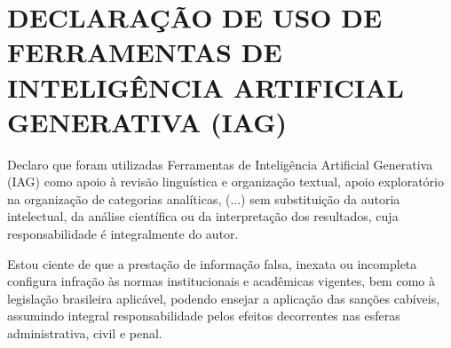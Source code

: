 \chapter*{DECLARAÇÃO DE USO DE FERRAMENTAS DE INTELIGÊNCIA ARTIFICIAL GENERATIVA (IAG)}
\label{declaracao_iag}

Declaro que foram utilizadas Ferramentas de Inteligência Artificial Generativa (IAG) como apoio à revisão linguística e organização textual, apoio exploratório na organização de categorias analíticas, (...) sem substituição da autoria intelectual, da análise científica ou da interpretação dos resultados, cuja responsabilidade é integralmente do autor.

Estou ciente de que a prestação de informação falsa, inexata ou incompleta configura infração às normas institucionais e acadêmicas vigentes, bem como à legislação brasileira aplicável, podendo ensejar a aplicação das sanções cabíveis, assumindo integral responsabilidade pelos efeitos decorrentes nas esferas administrativa, civil e penal.
